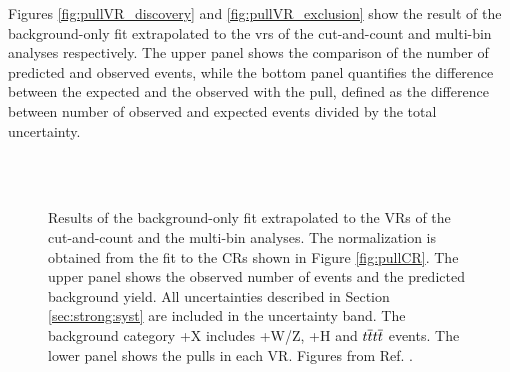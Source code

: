 Figures \ref{fig:pullVR_discovery} and \ref{fig:pullVR_exclusion} show the result of the background-only fit extrapolated to the \glspl{vr} of 
the cut-and-count and multi-bin analyses respectively. The upper panel shows the comparison of the number of predicted and observed events, 
while the bottom panel quantifies the difference between the expected and the observed with the pull, defined as the difference between 
number of observed and expected events divided by the total uncertainty. 

\begin{figure}[htbp]
	\centering
	\\
	\\
	\caption{Results of the background-only fit extrapolated to the VRs of  the cut-and-count and 
		the multi-bin analyses. The \ttbar normalization 
		is obtained from the fit to the CRs shown in Figure \ref{fig:pullCR}. The upper panel shows 
		the observed number of events and the predicted background yield.
		All uncertainties  described in Section \ref{sec:strong:syst} are included in the 
		uncertainty band. The background category \ttbar+X includes \ttbar+W/Z, 
		\ttbar+H and $t\overline{t} t\overline{t}$ events. The lower panel shows the pulls in 
		each VR.  Figures from Ref. \cite{Aaboud:2017hrg}.
	} 
	\label{fig:pullVR}
\end{figure}

